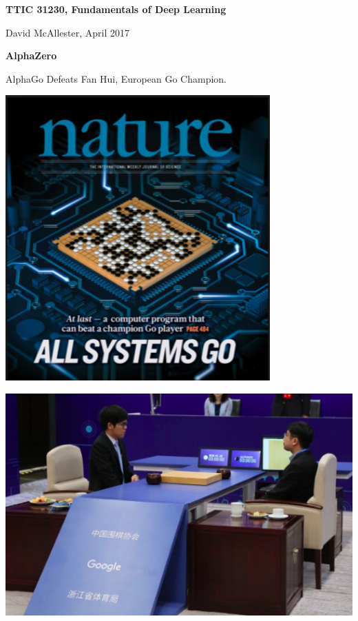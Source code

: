 



{\Huge

  \centerline{\bf TTIC 31230, Fundamentals of Deep Learning}
  \bigskip
  \centerline{David McAllester, April 2017}


\vfill
\centerline{\bf AlphaZero}
\vfill
\vfill


AlphaGo Defeats Fan Hui, European Go Champion.

\vfill
\centerline{\includegraphics[width=4in]{../images/alphago}}


\vfill
\centerline{\includegraphics[width=8in]{../images/alphalee}}

}
